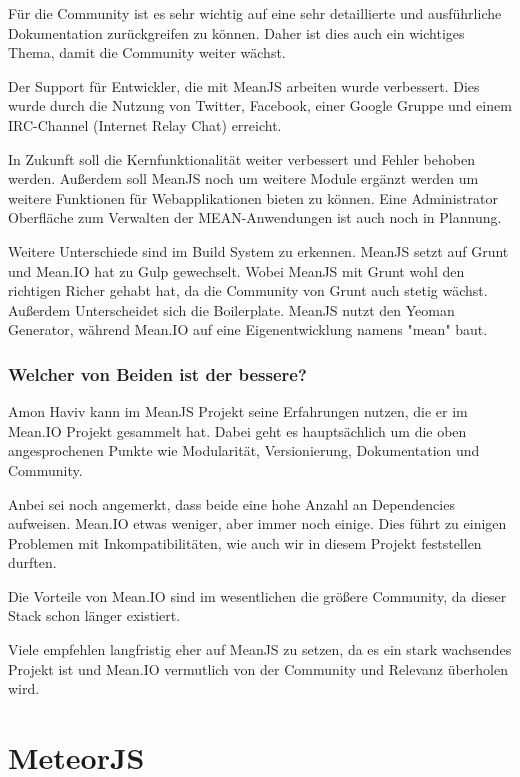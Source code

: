 Für die Community ist es sehr wichtig auf eine sehr detaillierte und ausführliche Dokumentation zurückgreifen zu können. Daher ist dies auch ein wichtiges Thema, damit die Community weiter wächst.

Der Support für Entwickler, die mit MeanJS arbeiten wurde verbessert. Dies wurde durch die Nutzung von Twitter, Facebook, einer Google Gruppe und einem IRC-Channel (Internet Relay Chat) erreicht.

In Zukunft soll die Kernfunktionalität weiter verbessert und Fehler behoben werden. Außerdem soll MeanJS noch um weitere Module ergänzt werden um weitere Funktionen für Webapplikationen bieten zu können. Eine Administrator Oberfläche zum Verwalten der MEAN-Anwendungen ist auch noch in Plannung.

\cite{meanJS:blog} \cite{meanJS:article}

Weitere Unterschiede sind im Build System zu erkennen. MeanJS setzt auf Grunt und Mean.IO hat zu Gulp gewechselt.
Wobei MeanJS mit Grunt wohl den richtigen Richer gehabt hat, da die Community von Grunt auch stetig wächst.
Außerdem Unterscheidet sich die Boilerplate. MeanJS nutzt den Yeoman Generator, während Mean.IO auf eine Eigenentwicklung namens "mean" baut.

\subsubsection{Welcher von Beiden ist der bessere?}

Amon Haviv kann im MeanJS Projekt seine Erfahrungen nutzen, die er im Mean.IO Projekt gesammelt hat.
Dabei geht es hauptsächlich um die oben angesprochenen Punkte wie Modularität, Versionierung, Dokumentation und Community.

Anbei sei noch angemerkt, dass beide eine hohe Anzahl an Dependencies aufweisen. Mean.IO etwas weniger, aber immer noch einige.
Dies führt zu einigen Problemen mit Inkompatibilitäten, wie auch wir in diesem Projekt feststellen durften.

Die Vorteile von Mean.IO sind im wesentlichen die größere Community, da dieser Stack schon länger existiert.

Viele empfehlen langfristig eher auf MeanJS zu setzen, da es ein stark wachsendes Projekt ist und Mean.IO vermutlich von der Community und Relevanz überholen wird. \cite{meanJS:article}

\section{MeteorJS}\label{meteor.js}

